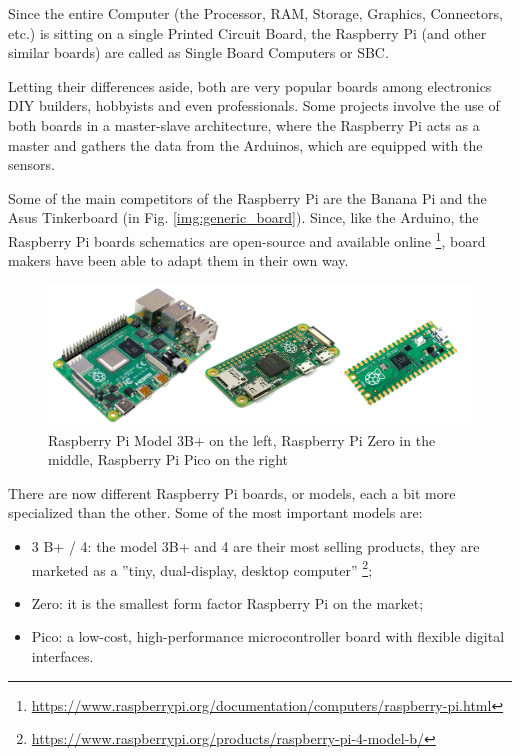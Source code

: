 			Since the entire Computer (the Processor, RAM, Storage, Graphics, Connectors, etc.) is sitting on a single Printed Circuit Board, the Raspberry Pi (and other similar boards) are called as Single Board Computers or SBC.
			
			Letting their differences aside, both are very popular boards among electronics DIY builders, hobbyists and even professionals.
			Some projects involve the use of both boards in a master-slave architecture, where the Raspberry Pi acts as a master and gathers the data from the Arduinos, which are equipped with the sensors.
			
			Some of the main competitors of the Raspberry Pi are the Banana Pi and the Asus Tinkerboard (in Fig. \ref{img:generic_board}).
			Since, like the Arduino, the Raspberry Pi boards schematics are open-source and available online \footnote{\url{https://www.raspberrypi.org/documentation/computers/raspberry-pi.html}}, board makers have been able to adapt them in their own way.
	
			
			\begin{figure}
				\centering
				\includegraphics[width=\textwidth]{resources/img/chap3/raspberry_types}
				\caption{Raspberry Pi Model 3B+ on the left, Raspberry Pi Zero in the middle, Raspberry Pi Pico on the right}
				\label{img:raspberry_board}
			\end{figure}
			
			There are now different Raspberry Pi boards, or models, each a bit more specialized than the other.
			Some of the most important models are:
			\begin{itemize}[noitemsep]
				\item 3 B+ / 4: the model 3B+ and 4 are their most selling products, they are marketed as a ''tiny, dual-display, desktop computer'' \footnote{\url{https://www.raspberrypi.org/products/raspberry-pi-4-model-b/}};
				\item Zero: it is the smallest form factor Raspberry Pi on the market;
				\item Pico: a low-cost, high-performance microcontroller board with flexible digital interfaces.
			\end{itemize}
			

